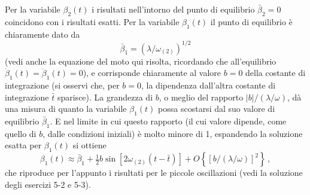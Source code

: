 \documentclass[11pt, a4paper]{book}
\numberwithin{equation}{section}
\begin{document}
Per la variabile $\beta_2(t)$ i risultati nell'intorno del punto di equilibrio
$\bar{\beta}_2=0$ coincidono con i risultati esatti. Per la variabile $\beta_1(t)$
il punto di equilibrio è chiaramente dato da
\[
    \bar{\beta}_1 = (\lambda/\omega_{(2)})^{1/2}
\]
(vedi anche la equazione del moto qui risolta, ricordando che all'equilibrio
$\dot{\beta}_1(t)=\ddot{\beta}_1(t)=0$), e corrisponde chiaramente al valore $b=0$
della costante di integrazione (si osservi che, per $b=0$, la dipendenza
dall'altra costante di integrazione $\bar{t}$ sparisce). La grandezza di $b$, o
meglio del rapporto $|b|/(\lambda/\omega)$, dà una misura di quanto la variabile
$\beta_1(t)$ possa scostarsi dal suo valore di equilibrio $\bar{\beta}_1$. E nel
limite in cui questo rapporto (il cui valore dipende, come quello di $b$, dalle
condizioni iniziali) è molto minore di 1, espandendo la soluzione esatta per
$\beta_1(t)$ si ottiene
\[
    \beta_1(t) \approx \bar{\beta}_1 + \tfrac{1}{2}b\sin[2\omega_{(2)}(t-\bar{t})]
    + O\left\{[b/(\lambda/\omega)]^2\right\} \,,
\]
che riproduce per l'appunto i risultati per le piccole oscillazioni (vedi la
soluzione degli esercizi 5-2 e 5-3).
\end{document}
